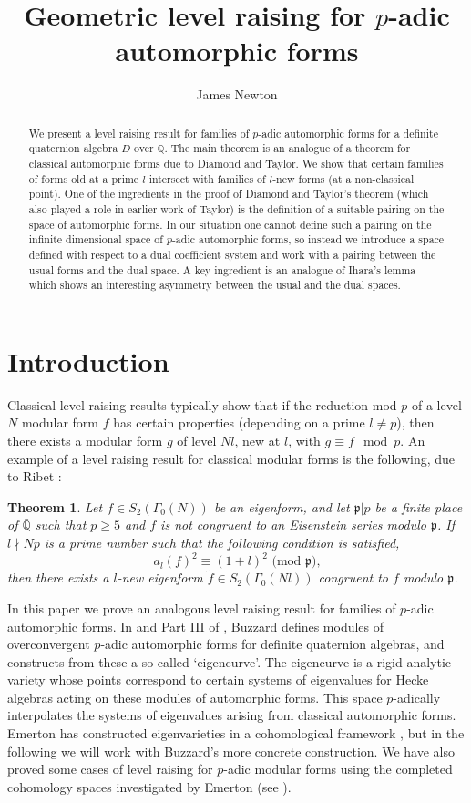 \documentclass[a4paper, notitlepage]{amsart}
\newcommand{\Q}{\ensuremath{\mathbb{Q}}\xspace}
\newcommand{\p}{\ensuremath{\mathfrak{p}}\xspace}
\newtheorem*{theor}{Theorem}
\begin{document}

\title[Geometric level raising]{Geometric level raising for $p$-adic automorphic forms}
\author{James Newton}
\begin{abstract}
We present a level raising result for families of $p$-adic automorphic forms for a definite quaternion algebra $D$ over $\Q$. The main theorem is an analogue of a theorem for classical automorphic forms due to Diamond and Taylor. We show that certain families of forms old at a prime $l$ intersect with families of $l$-new forms (at a non-classical point). One of the ingredients in the proof of Diamond and Taylor's theorem (which also played a role in earlier work of Taylor) is the definition of a suitable pairing on the space of automorphic forms. In our situation one cannot define such a pairing on the infinite dimensional space of $p$-adic automorphic forms, so instead we introduce a space defined with respect to a dual coefficient system and work with a pairing between the usual forms and the dual space. A key ingredient is an analogue of Ihara's lemma which shows an interesting asymmetry between the usual and the dual spaces.
\end{abstract}
\maketitle
\section{Introduction}
Classical level raising results typically show that if the reduction mod $p$ of a level $N$ modular form $f$ has certain properties (depending on a prime $l \ne p$), then there exists a modular form $g$ of level $Nl$, new at $l$, with $g \equiv f \mod p$. An example of a level raising result for classical modular forms is the following, due to Ribet \cite{MR804706}:
\begin{theor}
Let $f \in S_2(\Gamma_0(N))$ be an eigenform, and let
$\p|p$ be a finite place of $\bar{\Q}$ such that $p
\geq 5$ and $f$ is not congruent to an Eisenstein series modulo
$\p$. If $l \nmid Np$ is a prime number such that the following condition is satisfied,
$$
\text{$a_l(f)^2 \equiv (1+l)^2$ (mod $\p$),}
$$
then there exists a $l$-new eigenform $\tilde{f} \in
S_2(\Gamma_0(Nl))$ congruent to $f$ modulo $\p$.
\end{theor}
In this paper we prove an analogous level raising result for families of $p$-adic automorphic forms. In \cite{Bu1} and Part III of \cite{Bu2}, Buzzard defines modules of overconvergent $p$-adic automorphic forms for definite quaternion algebras, and constructs from these a so-called `eigencurve'. The eigencurve is a rigid analytic variety whose points correspond to certain systems of eigenvalues for Hecke algebras acting on these modules of automorphic forms. This space $p$-adically interpolates the systems of eigenvalues arising from classical automorphic forms. Emerton has constructed eigenvarieties in a cohomological framework \cite{Emint}, but in the following we will work with Buzzard's more concrete construction. We have also proved some cases of level raising for $p$-adic modular forms using the completed cohomology spaces investigated by Emerton (see \cite{cclr}).
\end{document}
